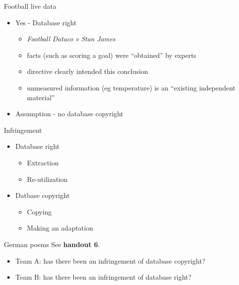 \documentclass[aspectratio=169,14pt]{beamer}
\begin{document}
  \begin{frame}{Football live data}
    \begin{itemize}
    \item Yes - Database right
      \begin{itemize}
      \item \protect\textit{Football Dataco v Stan James}
      \item facts (such as scoring a goal) were ``obtained'' by experts
      \item directive clearly intended this conclusion
      \item unmeasured information (eg temperature) is an ``existing independent material''
      \end{itemize}
    \item Assumption - no database copyright
    \end{itemize}
  \end{frame}

  \begin{frame}{Infringement}
    \begin{itemize}
    \item Database right
      \begin{itemize}
      \item Extraction
      \item Re-utilization
      \end{itemize}
    \item Datbase copyright
      \begin{itemize}
      \item Copying
      \item Making an adaptation
      \end{itemize}
    \end{itemize}
  \end{frame}

  \begin{frame}{German poems}
    See {\bf handout 6}.
    \begin{itemize}
    \item Team A: has there been an infringement of database copyright?
    \item Team B: has there been an infringement of database right?
    \end{itemize}
    
  \end{frame}
\end{document}
